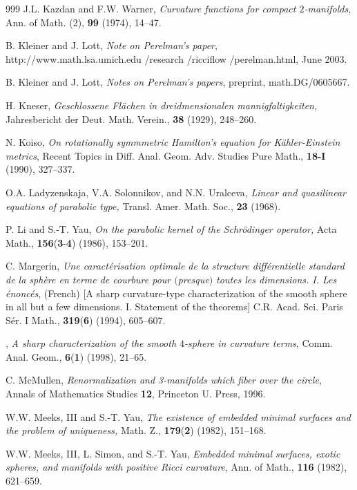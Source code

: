 \begin{thebibliography}{999}
J.L. Kazdan and F.W. Warner,
{\it Curvature functions for compact $2$-manifolds}, Ann. of Math.
(2),  \textbf{99} (1974), 14--47.

 B. Kleiner and J. Lott,
{\it Note on Perelman's paper}, http://www.math.lsa.umich.edu
/research /ricciflow /perelman.html, June 2003.

 B. Kleiner and J. Lott,
{\it Notes on Perelman's papers}, preprint, math.DG/0605667.

 H. Kneser,
{\it Geschlossene Fl\"{a}chen in dreidmensionalen
mannigfaltigkeiten,} Jahresbericht der Deut. Math. Verein.,
\textbf{38} (1929), 248--260.

 N. Koiso,
{\it On rotationally symmmetric Hamilton's equation for
K\"{a}hler-Einstein metrics}, Recent Topics in Diff. Anal. Geom.
Adv. Studies Pure Math., \textbf {18-I} (1990), 327--337.

 O.A. Ladyzenskaja, V.A. Solonnikov, and N.N. Uralceva,
{\it Linear and quasilinear equations of parabolic type,} Transl.
Amer. Math. Soc., {\bf 23} (1968).

 P. Li and S.-T. Yau,
{\it On the parabolic kernel of the Schr\"odinger operator,} Acta
Math., \textbf{156}({\bf 3}-{\bf 4}) (1986), 153--201.

 C. Margerin,
{\it Une caract\'erisation optimale de la structure
diff\'erentielle standard de la sph\`ere en terme de courbure pour
$($presque$)$ toutes les dimensions. I. Les \'enonc\'es}, (French)
[A sharp curvature-type characterization of the smooth sphere in
all but a few dimensions. I. Statement of the theorems] C.R. Acad.
Sci. Paris S\'er. I Math., \textbf{319}({\bf 6}) (1994), 605--607.

 \bysame,
{\it A sharp characterization of the smooth $4$-sphere in
curvature terms}, Comm. Anal. Geom., \textbf{6}({\bf 1}) (1998),
21--65.

 C. McMullen, {\it Renormalization and 3-manifolds
which fiber over the circle}, Annals of Mathematics Studies {\bf
12}, Princeton U. Press, 1996.


 W.W. Meeks, III and S.-T. Yau,
{\it  The existence of embedded minimal surfaces and the problem
of uniqueness,} Math. Z., \textbf{179}({\bf 2}) (1982), 151--168.

 W.W. Meeks, III, L. Simon, and S.-T. Yau,
{\it Embedded minimal surfaces, exotic spheres, and manifolds with
positive Ricci curvature}, Ann. of Math., \textbf{116} (1982),
621--659.


\end{thebibliography}
